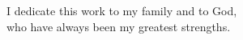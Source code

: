 \begin{dedicatoria}
   \vspace*{\fill}
   \begin{flushright}
     I dedicate this work to my family and to God, \\
     who have always been my greatest strengths.
   \end{flushright}
   \vspace*{\fill}
\end{dedicatoria}
